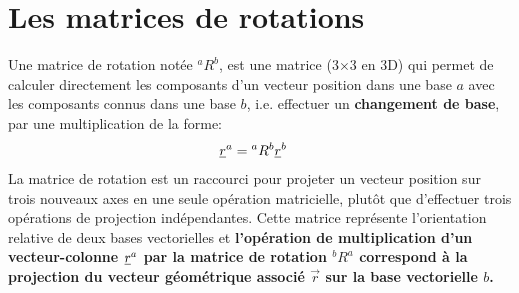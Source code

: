 







\newpage
\section{Les matrices de rotations}
\label{sec:changematrice}

Une matrice de rotation notée $^aR^b$, est une matrice (3$\times$3 en 3D) qui permet de calculer directement les composants d'un vecteur position dans une base $a$ avec les composants connus dans une base $b$, i.e. effectuer un \textbf{changement de base}, par une multiplication de la forme:
\begin{align}
\underline{r}^a &= {}^aR^b \underline{r}^b
\label{eq:basechange}
\end{align} 
La matrice de rotation est un raccourci pour projeter un vecteur position sur trois nouveaux axes en une seule opération matricielle, plutôt que d'effectuer trois opérations de projection indépendantes. Cette matrice représente l'orientation relative de deux bases vectorielles et  \textbf{l'opération de multiplication d'un vecteur-colonne $\underline{r}^a$ par la matrice de rotation $^bR^a$ correspond à la projection du vecteur géométrique associé $\vec{r}$ sur la base vectorielle $b$.}

